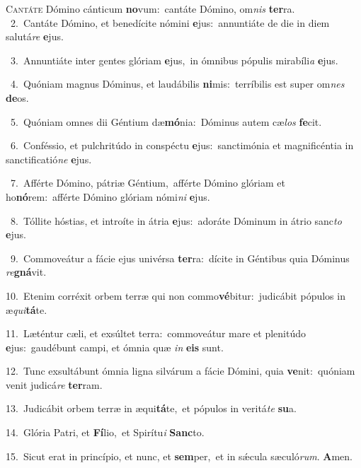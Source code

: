 \lettrine{\initial\textcolor{\initialcolor}{C}}{antáte} Dómino cánticum \textbf{no}\-vum:~\star cantáte Dómino, om\textit{nis} \textbf{ter}\-ra.\\
{\numbfont\textcolor{\numbcolor}{~2.}}~Cantáte Dómino, et benedícite nómini \textbf{e}\-jus:~\star annuntiáte de die in diem salutá\textit{re} \textbf{e}\-jus.\par
{\numbfont\textcolor{\numbcolor}{~3.}}~Annuntiáte inter gentes glóriam \textbf{e}\-jus,~\star in ómnibus pópulis mirabíli\textit{a} \textbf{e}\-jus.\par
{\numbfont\textcolor{\numbcolor}{~4.}}~Quóniam magnus Dóminus, et laudábilis \textbf{ni}\-mis:~\star terríbilis est super om\textit{nes} \textbf{de}\-os.\par
{\numbfont\textcolor{\numbcolor}{~5.}}~Quóniam omnes dii Géntium dæ\-\textbf{mó}\-nia:~\star Dóminus autem cæ\textit{los} \textbf{fe}\-cit.\par
{\numbfont\textcolor{\numbcolor}{~6.}}~Conféssio, et pulchritúdo in conspéctu \textbf{e}\-jus:~\star sanctimónia et magnificéntia in sanctificatió\textit{ne} \textbf{e}\-jus.\par
{\numbfont\textcolor{\numbcolor}{~7.}}~Afférte Dómino, pátriæ Géntium,~\dagger afférte Dómino glóriam et ho\-\textbf{nó}\-rem:~\star afférte Dómino glóriam nómi\textit{ni} \textbf{e}\-jus.\par
{\numbfont\textcolor{\numbcolor}{~8.}}~Tóllite hóstias, et introíte in átria \textbf{e}\-jus:~\star adoráte Dóminum in átrio sanc\textit{to} \textbf{e}\-jus.\par
{\numbfont\textcolor{\numbcolor}{~9.}}~Commoveátur a fácie ejus univérsa \textbf{ter}\-ra:~\star dícite in Géntibus quia Dóminus \textit{re}\-\textbf{gná}vit.\par
{\numbfont\textcolor{\numbcolor}{10.}}~Etenim corréxit orbem terræ qui non commo\-\textbf{vé}\-bitur:~\star judicábit pópulos in æ\-\textit{qui}\-\textbf{tá}te.\par
{\numbfont\textcolor{\numbcolor}{11.}}~Læténtur cæli, et exsúltet terra:~\dagger commoveátur mare et plenitúdo \textbf{e}\-jus:~\star gaudébunt campi, et ómnia quæ \textit{in} \textbf{e}\-\textbf{is} sunt.\par
{\numbfont\textcolor{\numbcolor}{12.}}~Tunc exsultábunt ómnia ligna silvárum a fácie Dómini, quia \textbf{ve}\-nit:~\star quóniam venit judicá\textit{re} \textbf{ter}\-ram.\par
{\numbfont\textcolor{\numbcolor}{13.}}~Judicábit orbem terræ in æqui\-\textbf{tá}\-te,~\star et pópulos in veritá\textit{te} \textbf{su}\-a.\par
{\numbfont\textcolor{\numbcolor}{14.}}~Glória Patri, et \textbf{Fí}\-lio,~\star et Spirítu\textit{i} \textbf{Sanc}\-to.\par
{\numbfont\textcolor{\numbcolor}{15.}}~Sicut erat in princípio, et nunc, et \textbf{sem}\-per,~\star et in sǽcula sæculó\-\textit{rum}\-. \textbf{A}\-men.\par
